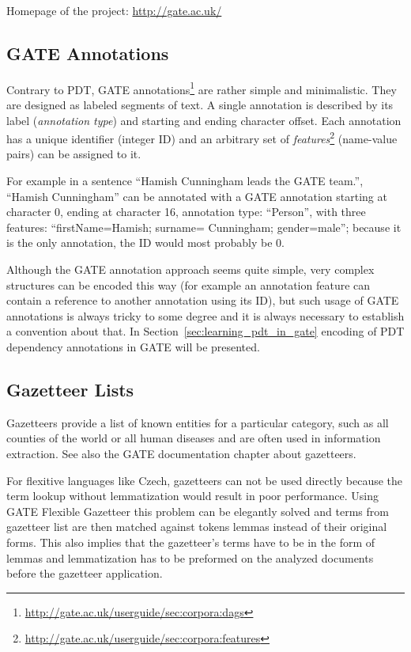 \medskip
Homepage of the project: \url{http://gate.ac.uk/}

\subsection{GATE Annotations} \label{sec:third_gate_annotations}
Contrary to PDT, GATE annotations\footnote{\url{http://gate.ac.uk/userguide/sec:corpora:dags}} are rather simple and minimalistic. They are designed as labeled segments of text. A single annotation is described by its label (\emph{annotation type}) and starting and ending character offset. Each annotation has a unique identifier (integer ID) and an arbitrary set of \emph{features}\footnote{\url{http://gate.ac.uk/userguide/sec:corpora:features}} (name-value pairs) can be assigned to it. 

For example in a sentence ``Hamish Cunningham leads the GATE team.'', ``Hamish Cunningham'' can be annotated with a GATE annotation starting at character 0, ending at character 16, annotation type: ``Person'', with three features: ``firstName=Hamish; surname= Cunningham; gender=male''; because it is the only annotation, the ID would most probably be 0.

Although the GATE annotation approach seems quite simple, very complex structures can be encoded this way (for example an annotation feature can contain a reference to another annotation using its ID), but such usage of GATE annotations is always tricky to some degree and it is always necessary to establish a convention about that. In Section~\ref{sec:learning_pdt_in_gate} encoding of PDT dependency annotations in GATE will be presented.


\subsection{Gazetteer Lists} \label{sec:third_gate_gaze}

Gazetteers provide a list of known entities for a particular category, such as all counties of the world or all human diseases and are often used in information extraction. See also the GATE documentation chapter about gazetteers.

For flexitive languages like Czech, gazetteers can not be used directly because the term lookup without lemmatization would result in poor performance. Using GATE Flexible Gazetteer this problem can be elegantly solved and terms from gazetteer list are then matched against tokens lemmas instead of their original forms. This also implies that the gazetteer’s terms have to be in the form of lemmas and lemmatization has to be preformed on the analyzed documents before the gazetteer application.




